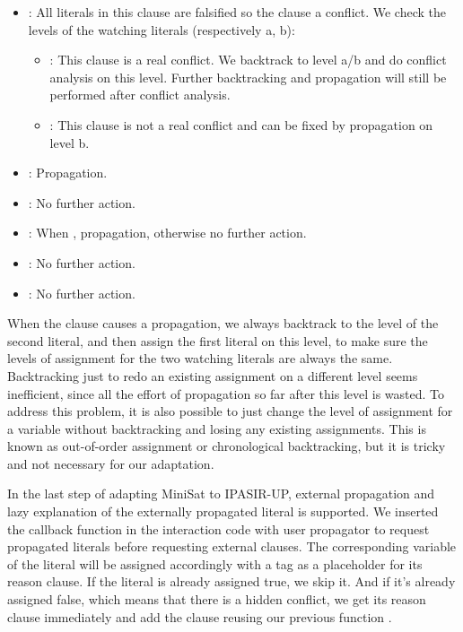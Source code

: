 \begin{itemize}
  \item {}: All literals in this clause are falsified so the clause a conflict. We check the levels of the watching literals (respectively a, b):
  \begin{itemize}
    \item {}: This clause is a real conflict. We backtrack to level a/b and do conflict analysis on this level. Further backtracking and propagation will still be performed after conflict analysis.
    \item {}: This clause is not a real conflict and can be fixed by propagation on level b.
  \end{itemize}
  \item {}: Propagation.
  \item {}: No further action.
  \item {}: When , propagation, otherwise no further action.
  \item {}: No further action.
  \item {}: No further action.
\end{itemize}

When the clause causes a propagation, we always backtrack to the level of the second literal, and then assign the first literal on this level, to make sure the levels of assignment for the two watching literals are always the same. Backtracking just to redo an existing assignment on a different level seems inefficient, since all the effort of propagation so far after this level is wasted. To address this problem, it is also possible to just change the level of assignment for a variable without backtracking and losing any existing assignments. This is known as out-of-order assignment or chronological backtracking, but it is tricky and not necessary for our adaptation.

In the last step of adapting MiniSat to IPASIR-UP, external propagation and lazy explanation of the externally propagated literal is supported. We inserted the callback function  in the interaction code with user propagator to request propagated literals before requesting external clauses. The corresponding variable of the literal will be assigned accordingly with a tag  as a placeholder for its reason clause. If the literal is already assigned true, we skip it. And if it's already assigned false, which means that there is a hidden conflict, we get its reason clause immediately and add the clause reusing our previous function .

